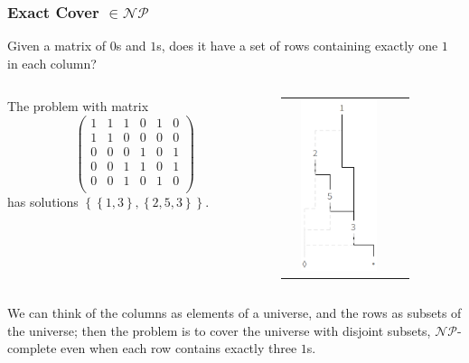 \documentclass{beamer}
\begin{document}
\begin{frame}[fragile]
\frametitle{Exact Cover $\in \mathcal{NP}$}
Given a matrix of $0$s and $1$s, does it have a set of rows containing exactly one $1$ in each column?
\begin{columns}
     \begin{column}{.5\linewidth}
      The problem with matrix
      \begin{displaymath}
       \left(\begin{array}{cccccc}
         1 & 1 & 1 & 0 & 1 & 0 \\
         1 & 1 & 0 & 0 & 0 & 0 \\
         0 & 0 & 0 & 1 & 0 & 1 \\
         0 & 0 & 1 & 1 & 0 & 1 \\
         0 & 0 & 1 & 0 & 1 & 0 \\
       \end{array}\right)
      \end{displaymath}
      has solutions $
        \left\lbrace
          \left\lbrace 1,3\right\rbrace,
          \left\lbrace 2,5,3\right\rbrace
        \right\rbrace
        $.
     \end{column}
     \begin{column}{.5\linewidth}
       \begin{tabular}{cc}
          \includegraphics[width=3cm,height=5cm]{ZDD.png}
       \end{tabular}
     \end{column}
   \end{columns}
We can think of the columns as elements of a universe, and the rows as subsets of the universe; 
then the problem is to cover the universe with disjoint subsets, $\mathcal{NP}$-complete even 
when each row contains exactly three $1$s.
\end{frame}
\end{document}
